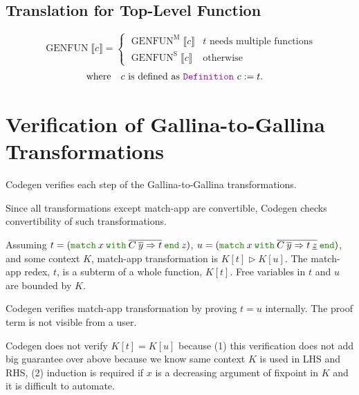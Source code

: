 \documentclass[a4paper,fleqn]{article}
\def\gallina{\textrm{Gallina}}
\def\codegen{\textrm{Codegen}}
\newcommand{\kwDefinition}{\mbox{\color{myviolet}\ttfamily Definition}}
\newcommand{\kwmatch}{\mbox{\color{mygreen}\ttfamily match}}
\newcommand{\kwwith}{\mbox{\color{mygreen}\ttfamily with}}
\newcommand{\kwend}{\mbox{\color{mygreen}\ttfamily end}}
\newcommand{\omatch}[2]{\kwmatch\:#1\:\kwwith\:{#2}\:\kwend}
\newcommand{\BRA}[1]{\llbracket #1 \rrbracket}
\DeclareMathOperator{\genfunop}{GENFUN}
\newcommand{\genfun}[1]{\genfunop\BRA{#1}}
\newcommand{\genfuns}[1]{\genfunop^\mathrm{S}\BRA{#1}}
\newcommand{\genfunm}[1]{\genfunop^\mathrm{M}\BRA{#1}}
\DeclareMathOperator{\Bop}{B}
\newcommand{\B}[2]{\Bop_{#1}\BRA{#2}}
\newcommand{\reltri}{\mathrel{\triangleright}}
\newcommand{\rep}[1]{\overline{#1}}
\begin{document}
\subsection{Translation for Top-Level Function}\label{sec:genfun}
\[
  \genfun{c} =
  \begin{cases}
    \genfunm{c} & \text{$t$ needs multiple functions} \\
    \genfuns{c} & \text{otherwise}
  \end{cases}
\]
\[ \text{where} \quad
  \begin{aligned}[t]
    & \text{$c$ is defined as \kwDefinition~$c := t.$}
  \end{aligned}
\]

\section{Verification of \gallina-to-\gallina{} Transformations}\label{sec:verification-of-gallina-to-gallina-transformations}

\codegen{} verifies each step of the \gallina-to-\gallina{} transformations.

Since all transformations except match-app are convertible,
\codegen{} checks convertibility of such transformations.


Assuming $t = (\omatch{x}{\rep{C\: \rep{y}\Rightarrow t}}\: z)$,
$u = (\omatch{x}{\rep{C\: \rep{y} \Rightarrow t\: \underline{z}}})$, and
some context $K$,
match-app transformation is $K[t] \reltri K[u]$.
The match-app redex, $t$, is a subterm of a whole function, $K[t]$.
Free variables in $t$ and $u$ are bounded by $K$.

\codegen{} verifies match-app transformation by proving $t = u$ internally.
The proof term is not visible from a user.

\codegen{} does not verify $K[t] = K[u]$ because
(1) this verification does not add big guarantee over above because we know same context $K$ is used in LHS and RHS,
(2) induction is required if $x$ is a decreasing argument of fixpoint in $K$ and it is difficult to automate.



\end{document}
